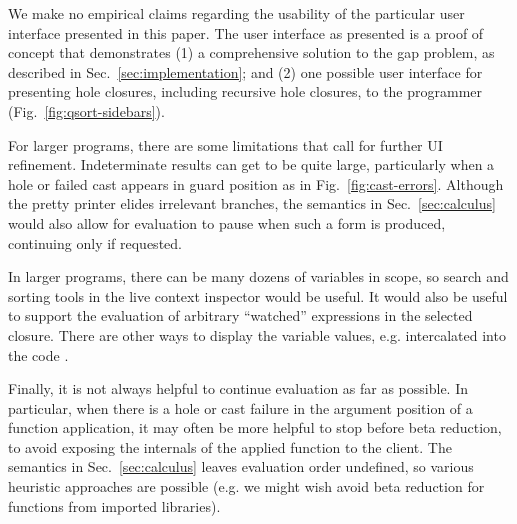 We make no empirical claims regarding the usability of the particular user interface presented in this paper. The \Hazel user interface as presented is a proof of concept
that demonstrates (1) a comprehensive solution to the gap problem, as described in Sec.~\ref{sec:implementation}; and 
(2) one possible user interface for presenting hole closures, including recursive hole closures, to the programmer (Fig.~\ref{fig:qsort-sidebars}). 

For larger programs, there are some limitations that call for further UI refinement. 
Indeterminate results can get to be quite large, particularly when a hole or failed cast
appears in guard position as in Fig.~\ref{fig:cast-errors}. 
Although the pretty printer elides irrelevant branches, 
the semantics in Sec.~\ref{sec:calculus} would also allow for evaluation to pause when such
a form is produced, continuing only if requested. 

In larger programs, there can be many dozens of variables in scope, so search and sorting tools in the live context inspector would be useful. It would also be useful
to support the evaluation of arbitrary ``watched'' expressions in the selected 
closure. There are other ways to display the variable values, e.g. intercalated
into the code \cite{DBLP:journals/corr/abs-1806-07449,lamdu}.

Finally, it is not always helpful to continue evaluation as far as possible.
In particular, when there is a hole or cast failure in the argument position
of a function application, it may often be more helpful to stop before 
beta reduction, to avoid exposing the internals of the applied function to 
the client. The semantics in Sec.~\ref{sec:calculus} leaves evaluation order
undefined, so various heuristic approaches are possible (e.g. we might wish avoid beta reduction  for functions from imported libraries).




